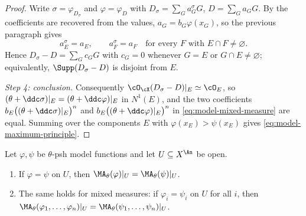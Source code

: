 \begin{proof}
Write \(\sigma=\varphi_{D_\sigma}\) and \(\varphi=\varphi_{D}\) with
\(D_\sigma=\sum_Ga_G^\sigma G\), \(D=\sum_Ga_GG\).  By
 the coefficients are recovered
from the values, \(a_G=b_G\varphi(x_G)\), so the previous paragraph gives
\[
 a_E^\sigma=a_E,\qquad a_F^\sigma=a_F
 \quad\text{for every }F\text{ with }E\cap F\neq\varnothing .
\]
Hence \(D_\sigma-D=\sum_Gc_GG\) with \(c_G=0\) whenever \(G=E\) or
\(G\cap E\neq\varnothing\); equivalently, \(\Supp(D_\sigma-D)\) is disjoint
from \(E\).

\emph{Step 4: conclusion.}  Consequently
\(\cO_{\cX}(D_\sigma-D)|_E\simeq\cO_E\), so
\((\theta+\ddc\sigma)|_E=(\theta+\ddc\varphi)|_E\) in \(N^1(E)\), and the
two coefficients
\(b_E\bigl((\theta+\ddc\sigma)|_E\bigr)^n\) and
\(b_E\bigl((\theta+\ddc\varphi)|_E\bigr)^n\) in
\eqref{eq:model-mixed-measure} are equal.  Summing over the components \(E\)
with \(\varphi(x_E)>\psi(x_E)\) gives
\eqref{eq:model-maximum-principle}.
\end{proof}

\begin{corollary}
\label{cor:ch24-model-locality-open}
Let \(\varphi,\psi\) be \(\theta\)-psh model functions and let
\(U\subseteq X^{\An}\) be open.
\begin{enumerate}
\item\label{itm:ch24-mlo:agree} If \(\varphi=\psi\) on \(U\), then
 \(\MA_\theta(\varphi)|_U=\MA_\theta(\psi)|_U\).
\item\label{itm:ch24-mlo:mixed} The same holds for mixed measures: if
 \(\varphi_i=\psi_i\) on \(U\) for all \(i\), then
 \(\MA_\theta(\varphi_1,\ldots,\varphi_n)|_U
   =\MA_\theta(\psi_1,\ldots,\psi_n)|_U\).
\end{enumerate}
\end{corollary}

